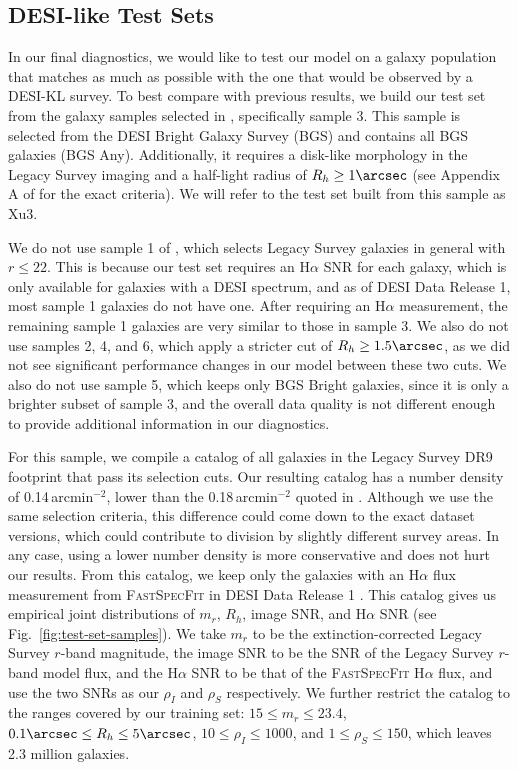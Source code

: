 \subsection{DESI-like Test Sets}
\label{ssec:test-set}

In our final diagnostics, we would like to test our model on a galaxy population that matches as much as possible with the one that would be observed by a DESI-KL survey. To best compare with previous results, we build our test set from the galaxy samples selected in \citep{KLDESI}, specifically sample 3. This sample is selected from the DESI Bright Galaxy Survey (BGS) \citep{BGS} and contains all BGS galaxies (BGS Any). Additionally, it requires a disk-like morphology in the Legacy Survey imaging \citep{LSImaging} and a half-light radius of $R_h \geq 1\arcsec$ (see Appendix A of \citep{KLDESI} for the exact criteria). We will refer to the test set built from this sample as Xu3.

We do not use sample 1 of \citep{KLDESI}, which selects Legacy Survey galaxies in general with $r \leq 22$. This is because our test set requires an H$\alpha$ SNR for each galaxy, which is only available for galaxies with a DESI spectrum, and as of DESI Data Release 1, most sample 1 galaxies do not have one. After requiring an H$\alpha$ measurement, the remaining sample 1 galaxies are very similar to those in sample 3. We also do not use samples 2, 4, and 6, which apply a stricter cut of $R_h \geq 1.5\arcsec$, as we did not see significant performance changes in our model between these two cuts. We also do not use sample 5, which keeps only BGS Bright galaxies, since it is only a brighter subset of sample 3, and the overall data quality is not different enough to provide additional information in our diagnostics.

For this sample, we compile a catalog of all galaxies in the Legacy Survey DR9 footprint that pass its selection cuts. Our resulting catalog has a number density of 0.14\,arcmin$^{-2}$, lower than the 0.18\,arcmin$^{-2}$ quoted in \citep{KLDESI}. Although we use the same selection criteria, this difference could come down to the exact dataset versions, which could contribute to division by slightly different survey areas. In any case, using a lower number density is more conservative and does not hurt our results. From this catalog, we keep only the galaxies with an H$\alpha$ flux measurement from \textsc{FastSpecFit} \citep{FastSpecFit} in DESI Data Release 1 \citep{DESIDR1}. This catalog gives us empirical joint distributions of $m_r$, $R_h$, image SNR, and H$\alpha$ SNR (see Fig.~\ref{fig:test-set-samples}). We take $m_r$ to be the extinction-corrected Legacy Survey $r$-band magnitude, the image SNR to be the SNR of the Legacy Survey $r$-band model flux, and the H$\alpha$ SNR to be that of the \textsc{FastSpecFit} H$\alpha$ flux, and use the two SNRs as our $\rho_I$ and $\rho_S$ respectively. We further restrict the catalog to the ranges covered by our training set: $15 \leq m_r \leq 23.4$, $0.1\arcsec \leq R_h \leq 5\arcsec$, $10 \leq \rho_I \leq 1000$, and $1 \leq \rho_S \leq 150$, which leaves 2.3 million galaxies.

